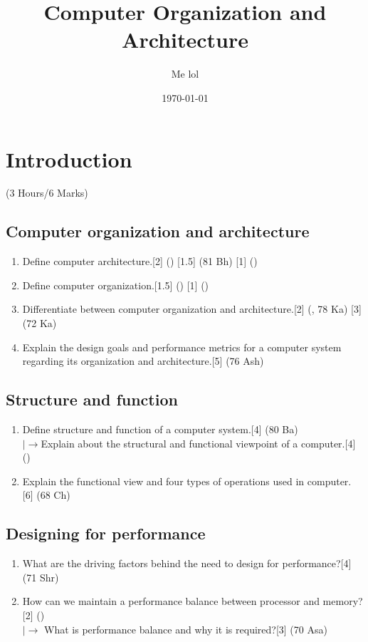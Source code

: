 \documentclass[12pt]{article}
\title{Computer Organization and Architecture}
\author{Me lol}
\date{\today}
\newcommand{\lb}{\left|\rightarrow\right.}
\begin{document}
\maketitle
\pagebreak
\tableofcontents
\pagebreak

\section{Introduction}
\begin{center}(3 Hours/6 Marks)\end{center}
\subsection{Computer organization and architecture}
\begin{enumerate}[noitemsep, topsep = 0pt]
\item Define computer architecture.\hfill[2] () [1.5] (81 Bh) [1] ()
\item Define computer organization.\hfill[1.5] () [1] ()
\item Differentiate between computer organization and architecture.\hfill[2] (, 78 Ka) [3] (72 Ka)
\item Explain the design goals and performance metrics for a computer system regarding its organization and architecture.\hspace{9.9cm}[5] (76 Ash)
\end{enumerate}
\subsection{Structure and function}
\begin{enumerate}[noitemsep, topsep = 0pt]
\item Define structure and function of a computer system.\hfill[4] (80 Ba)\\
$\lb$Explain about the structural and functional viewpoint of a computer.\hfill[4] ()
\item Explain the functional view and four types of operations used in computer. \hfill[6] (68 Ch)
\end{enumerate}
\subsection{Designing for performance}
\begin{enumerate}[noitemsep, topsep = 0pt]
\item What are the driving factors behind the need to design for performance?\hfill[4] (71 Shr)
\item How can we maintain a performance balance between processor and memory?\hfill[2] ()\\
$\lb$ What is performance balance and why it is required?\hfill[3] (70 Asa)
\end{enumerate}
\end{document}
